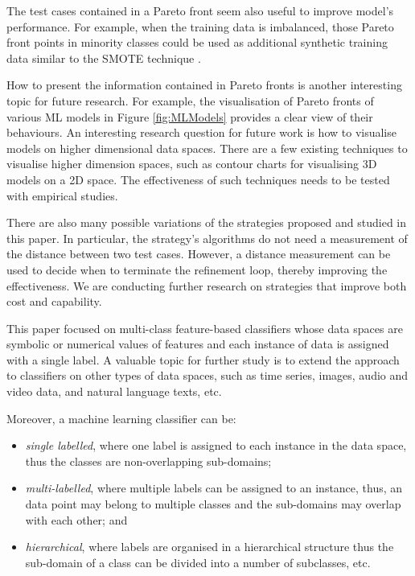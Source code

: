 \documentclass[preprint,1p,authoryear,times]{elsarticle}
\begin{document}
The test cases contained in a Pareto front seem also useful to improve model's performance. For example, when the training data is imbalanced, those Pareto front points in minority classes could be used as additional synthetic training data similar to the SMOTE technique \citep{Fernandez_et_al2018}.  

How to present the information contained in Pareto fronts is another interesting topic for future research. For example, the visualisation of Pareto fronts of various ML models in Figure \ref{fig:MLModels} provides a clear view of their behaviours. An interesting research question for future work is how to visualise models on higher dimensional data spaces. There are a few existing techniques to visualise higher dimension spaces, such as contour charts for visualising 3D models on a 2D space. The effectiveness of such techniques needs to be tested with empirical studies. 

There are also many possible variations of the strategies proposed and studied in this paper. In particular, the strategy's algorithms do not need a measurement of the distance between two test cases. However, a distance measurement can be used to decide when to terminate the refinement loop, thereby improving the effectiveness. We are conducting further research on strategies that improve both cost and capability. 

This paper focused on multi-class feature-based classifiers whose data spaces are symbolic or numerical values of features and each instance of data is assigned with a single label. A valuable topic for further study is to extend the approach to classifiers on other types of data spaces, such as time series, images, audio and video data, and natural language texts, etc. 

Moreover, a machine learning classifier can be:
\begin{itemize}
\item \emph{single labelled}, where one label is assigned to each instance in the data space, thus the classes are non-overlapping sub-domains; 
\item \emph{multi-labelled}, where multiple labels can be assigned to an instance, thus, an data point may belong to multiple classes and the sub-domains may overlap with each other; and
\item \emph{hierarchical}, where labels are organised in a hierarchical structure thus the sub-domain of a class can be divided into a number of subclasses, etc. 
\end{itemize} 
\end{document}
